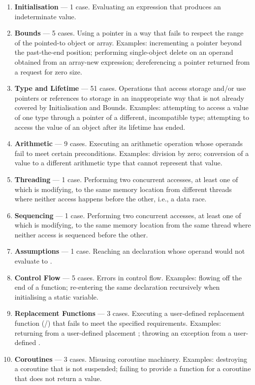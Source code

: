  \renewcommand{\labelenumi}{\Roman{enumi}.}
\begin{enumerate}
\item \textbf{Initialisation} --- 1 case. Evaluating an expression that produces an indeterminate value.
\item \textbf{Bounds} --- 5 cases. Using a pointer in a way that fails to respect the range of the pointed-to object or array. Examples: incrementing a pointer beyond the past-the-end position; performing single-object delete on an operand obtained from an array-new expression;  dereferencing a pointer returned from a request for zero size.
\item \textbf{Type and Lifetime} --- 51 cases. Operations that access storage and/or use pointers or references to storage in an inappropriate way that is not already covered by Initialisation and Bounds. Examples: attempting to access a value of one type through  a pointer of a different, incompatible type; attempting to access the value of an object after its lifetime has ended. 
\item \textbf{Arithmetic} --- 9 cases. Executing an arithmetic operation whose operands fail to meet certain preconditions. Examples: division by zero; conversion of a value to a different arithmetic type that cannot represent that value. 
\item \textbf{Threading} --- 1 case. Performing two concurrent accesses, at least one of which is modifying, to the same memory location from different threads where neither access happens before the other, i.e., a data race.
\item \textbf{Sequencing} --- 1 case. Performing two concurrent accesses, at least one of which is modifying, to the same memory location from the same thread where neither access is sequenced before the other.
\item \textbf{Assumptions} --- 1 case. Reaching an \tcode{[[assume]]} declaration whose operand would not evaluate to .
\item \textbf{Control Flow} --- 5 cases. Errors in control flow. Examples: flowing off the end of a function; re-entering the same declaration recursively when initialising a static variable.
\item \textbf{Replacement Functions} --- 3 cases. Executing a user-defined replacement function (/) that fails to meet the specified requirements. Examples: returning  from a user-defined placement ; throwing an exception from a user-defined .
\item \textbf{Coroutines} --- 3 cases. Misusing coroutine machinery. Examples: destroying a coroutine that is not suspended; failing to provide a  function for a coroutine that does not return a value.
\end{enumerate}

